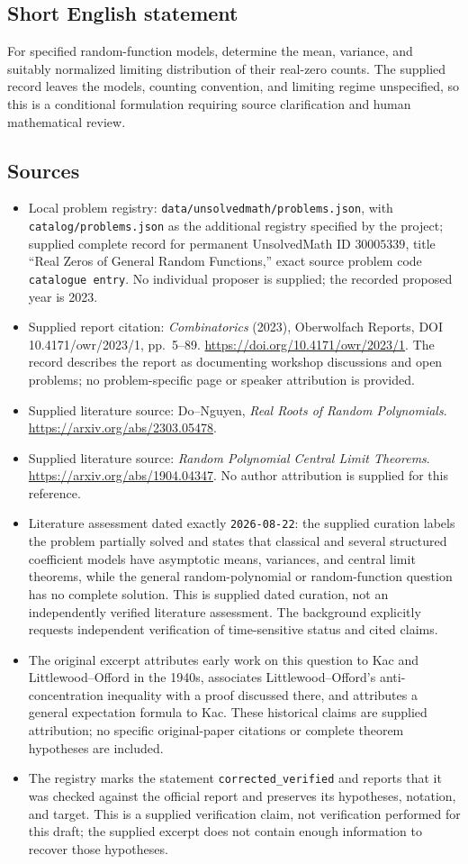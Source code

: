 \documentclass[11pt]{article}
\begin{document}
\subsection{Short English statement}
For specified random-function models, determine the mean, variance, and suitably normalized limiting distribution of their real-zero counts. The supplied record leaves the models, counting convention, and limiting regime unspecified, so this is a conditional formulation requiring source clarification and human mathematical review.
\subsection{Sources}
\begin{itemize}
\item Local problem registry: \texttt{data/unsolvedmath/problems.json}, with \texttt{catalog/problems.json} as the additional registry specified by the project; supplied complete record for permanent UnsolvedMath ID \(30005339\), title ``Real Zeros of General Random Functions,'' exact source problem code \texttt{catalogue entry}. No individual proposer is supplied; the recorded proposed year is 2023.
\item Supplied report citation: \emph{Combinatorics} (2023), Oberwolfach Reports, DOI 10.4171/owr/2023/1, pp.\ 5--89. \url{https://doi.org/10.4171/owr/2023/1}. The record describes the report as documenting workshop discussions and open problems; no problem-specific page or speaker attribution is provided.
\item Supplied literature source: Do--Nguyen, \emph{Real Roots of Random Polynomials}. \url{https://arxiv.org/abs/2303.05478}.
\item Supplied literature source: \emph{Random Polynomial Central Limit Theorems}. \url{https://arxiv.org/abs/1904.04347}. No author attribution is supplied for this reference.
\item Literature assessment dated exactly \texttt{2026-08-22}: the supplied curation labels the problem partially solved and states that classical and several structured coefficient models have asymptotic means, variances, and central limit theorems, while the general random-polynomial or random-function question has no complete solution. This is supplied dated curation, not an independently verified literature assessment. The background explicitly requests independent verification of time-sensitive status and cited claims.
\item The original excerpt attributes early work on this question to Kac and Littlewood--Offord in the 1940s, associates Littlewood--Offord's anti-concentration inequality with a proof discussed there, and attributes a general expectation formula to Kac. These historical claims are supplied attribution; no specific original-paper citations or complete theorem hypotheses are included.
\item The registry marks the statement \texttt{corrected\_verified} and reports that it was checked against the official report and preserves its hypotheses, notation, and target. This is a supplied verification claim, not verification performed for this draft; the supplied excerpt does not contain enough information to recover those hypotheses.
\end{itemize}
\end{document}
